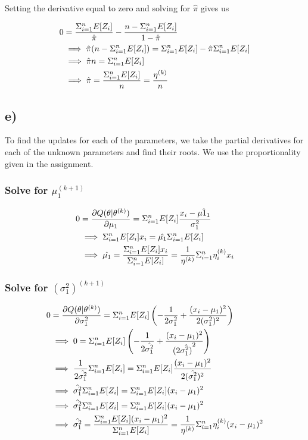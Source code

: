 \documentclass[]{article}
\begin{document}
Setting the derivative equal to zero and solving for \(\hat{\pi}\) gives
us

\begin{align*}
0 &= \frac{\Sigma_{i=1}^{n} E[Z_i]}{\hat{\pi}} - \frac{n - \Sigma_{i=1}^{n} E[Z_i]}{1-\hat{\pi}} \\
&\implies \hat{\pi}(n - \Sigma_{i=1}^{n} E[Z_i]) = \Sigma_{i=1}^{n} E[Z_i] - \hat{\pi} \Sigma_{i=1}^{n} E[Z_i] \\
&\implies \hat{\pi} n = \Sigma_{i=1}^{n} E[Z_i] \\
&\implies \hat{\pi} = \frac{\Sigma_{i=1}^{n} E[Z_i]}{n} = \frac{\eta^{(k)}}{n}
\end{align*}

\subsection{e)}\label{e-1}

To find the updates for each of the parameters, we take the partial
derivatives for each of the unknown parameters and find their roots. We
use the proportionality given in the assignment.

\subsubsection{\texorpdfstring{Solve for
\(\mu_1^{(k + 1)}\)}{Solve for \textbackslash{}mu\_1\^{}\{(k + 1)\}}}\label{solve-for-mu_1k-1}

\begin{align*}
0 &= \frac{\partial Q(\theta | \theta^{(k)})}{\partial \mu_1} = \Sigma_{i=1}^{n} E[Z_i] \frac{x_i - \hat{\mu1_1}}{\sigma_1^2} \\
&\implies \Sigma_{i=1}^{n} E[Z_i]x_i = \hat{\mu_1} \Sigma_{i=1}^{n} E[Z_i] \\
&\implies \hat{\mu_1} = \frac{\Sigma_{i=1}^{n} E[Z_i] x_i}{\Sigma_{i=1}^{n} E[Z_i]} = \frac{1}{\eta^{(k)}}\Sigma_{i=1}^{n} \eta^{(k)}_i x_i
\end{align*}

\subsubsection{\texorpdfstring{Solve for
\((\sigma_1^2)^{(k + 1)}\)}{Solve for (\textbackslash{}sigma\_1\^{}2)\^{}\{(k + 1)\}}}\label{solve-for-sigma_12k-1}

\begin{align*}
0 &= \frac{\partial Q(\theta | \theta^{(k)})}{\partial \sigma_1^{2}} = \Sigma_{i=1}^{n} E[Z_i] \left(- \frac{1}{2 \sigma_1^2} + 
\frac{(x_i - \mu_1)^2}{ 2 (\sigma_1^2)^2}\right) \\
&\implies 0 = \Sigma_{i=1}^{n} E[Z_i] \left( 
- \frac{1}{2 \hat{\sigma_1^2}} + 
\frac{(x_i - \mu_1)^2}{(2 \hat{\sigma_1^2)}^2}
\right) \\
&\implies  \frac{1}{2\hat{\sigma_1^2}} \Sigma_{i=1}^{n} E[Z_i] = \Sigma_{i=1}^{n} E[Z_i] \frac{(x_i - \mu_1)^2}{2 (\hat{\sigma_1^2})^2} \\
&\implies \hat{\sigma_1^2} \Sigma_{i=1}^{n} E[Z_i] = \Sigma_{i=1}^{n} E[Z_i] (x_i - \mu_1)^2 \\
&\implies \hat{\sigma_1^2} \Sigma_{i=1}^{n} E[Z_i] = \Sigma_{i=1}^{n} E[Z_i] (x_i - \mu_1)^2 \\
&\implies \hat{\sigma_1^2} = \frac{\Sigma_{i=1}^{n} E[Z_i] (x_i - \mu_1)^2}{\Sigma_{i=1}^{n} E[Z_i]} = \frac{1}{\eta^{(k)}} \Sigma_{i=1}^{n} \eta^{(k)}_i (x_i - \mu_1)^2
\end{align*}
\end{document}
